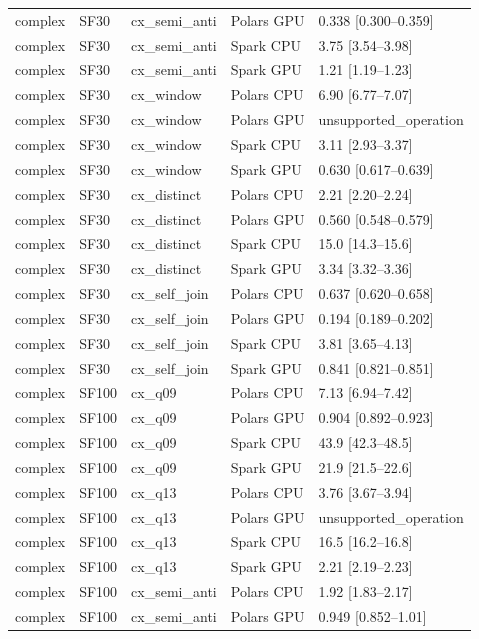\begin{longtable}{lllll}
complex & SF30 & cx\_semi\_anti & Polars GPU & 0.338 [0.300--0.359] \\
complex & SF30 & cx\_semi\_anti & Spark CPU & 3.75 [3.54--3.98] \\
complex & SF30 & cx\_semi\_anti & Spark GPU & 1.21 [1.19--1.23] \\
complex & SF30 & cx\_window & Polars CPU & 6.90 [6.77--7.07] \\
complex & SF30 & cx\_window & Polars GPU & unsupported\_operation \\
complex & SF30 & cx\_window & Spark CPU & 3.11 [2.93--3.37] \\
complex & SF30 & cx\_window & Spark GPU & 0.630 [0.617--0.639] \\
complex & SF30 & cx\_distinct & Polars CPU & 2.21 [2.20--2.24] \\
complex & SF30 & cx\_distinct & Polars GPU & 0.560 [0.548--0.579] \\
complex & SF30 & cx\_distinct & Spark CPU & 15.0 [14.3--15.6] \\
complex & SF30 & cx\_distinct & Spark GPU & 3.34 [3.32--3.36] \\
complex & SF30 & cx\_self\_join & Polars CPU & 0.637 [0.620--0.658] \\
complex & SF30 & cx\_self\_join & Polars GPU & 0.194 [0.189--0.202] \\
complex & SF30 & cx\_self\_join & Spark CPU & 3.81 [3.65--4.13] \\
complex & SF30 & cx\_self\_join & Spark GPU & 0.841 [0.821--0.851] \\
complex & SF100 & cx\_q09 & Polars CPU & 7.13 [6.94--7.42] \\
complex & SF100 & cx\_q09 & Polars GPU & 0.904 [0.892--0.923] \\
complex & SF100 & cx\_q09 & Spark CPU & 43.9 [42.3--48.5] \\
complex & SF100 & cx\_q09 & Spark GPU & 21.9 [21.5--22.6] \\
complex & SF100 & cx\_q13 & Polars CPU & 3.76 [3.67--3.94] \\
complex & SF100 & cx\_q13 & Polars GPU & unsupported\_operation \\
complex & SF100 & cx\_q13 & Spark CPU & 16.5 [16.2--16.8] \\
complex & SF100 & cx\_q13 & Spark GPU & 2.21 [2.19--2.23] \\
complex & SF100 & cx\_semi\_anti & Polars CPU & 1.92 [1.83--2.17] \\
complex & SF100 & cx\_semi\_anti & Polars GPU & 0.949 [0.852--1.01] \\

\end{longtable}
